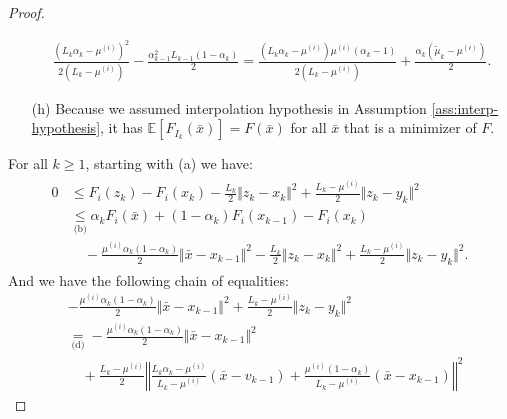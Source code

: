 \documentclass[12pt]{article}
\begin{document}
\begin{proof}
\begin{itemize}
\begin{align*}
                \frac{\left(
                    L_k\alpha_k - \mu^{(i)}
                \right)^2}{2(L_k - \mu^{(i)})} 
                -
                \frac{\alpha_{k - 1}^2L_{k - 1}(1 - \alpha_k)}{2} 
                = 
                \frac{
                \left(L_k \alpha_k - \mu^{(i)}\right)\mu^{(i)}
                \left(\alpha_k - 1\right)
                }
                {2(L_k - \mu^{(i)})}
                + \frac{\alpha_k(\tilde \mu_k - \mu^{(i)})}{2}. 
            \end{align*}
            \item[(h)] Because we assumed interpolation hypothesis in Assumption \ref{ass:interp-hypothesis}, it has $\mathbb E[F_{I_k}(\bar x)] = F(\bar x)$ for all $\bar x$ that is a minimizer of $F$. 
        \end{itemize}
        For all $k \ge 1$, starting with (a) we have: 
        \begin{align}\label{ineq:snapg2-one-step-chain1}
            \begin{split}
                0 &\le F_i(z_k) - F_i(x_k) - \frac{L_k}{2}\Vert z_k - x_k\Vert^2 + \frac{L_k - \mu^{(i)}}{2}\Vert z_k - y_k\Vert^2
                \\
                &\underset{\text{(b)}}{\le}
                \alpha_k F_i(\bar x) + (1 - \alpha_k)F_i(x_{k - 1}) - F_i(x_k) \\
                    &\quad 
                    - \frac{\mu^{(i)}\alpha_k(1 - \alpha_k)}{2}\Vert \bar x - x_{k - 1}\Vert^2
                    - \frac{L_k}{2}\Vert z_k - x_k\Vert^2 
                    + \frac{L_k - \mu^{(i)}}{2}\Vert z_k - y_k\Vert^2. 
            \end{split}
        \end{align}
        And we have the following chain of equalities:
        {\allowdisplaybreaks
        \begin{align*}
            & - \frac{\mu^{(i)}\alpha_k(1 - \alpha_k)}{2}\Vert \bar x - x_{k - 1}\Vert^2
            + \frac{L_k - \mu^{(i)}}{2}\Vert z_k - y_k\Vert^2
            \\
            &\underset{\text{(d)}}{=}
            - \frac{\mu^{(i)}\alpha_k(1 - \alpha_k)}{2}\Vert \bar x - x_{k - 1}\Vert^2 
                \\&\quad
                + \frac{L_k - \mu^{(i)}}{2}
                \left\Vert
                    \frac{L_k\alpha_k - \mu^{(i)}}{L_k - \mu^{(i)}}(\bar x - v_{k - 1})
                    + \frac{\mu^{(i)}(1 - \alpha_k)}{L_k - \mu^{(i)}}(\bar x - x_{k - 1})
                \right\Vert^2

\end{align*}}
\end{proof}
\end{document}
